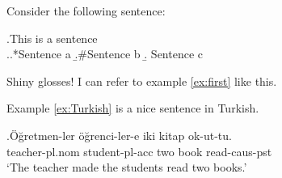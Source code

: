 \documentclass{article}
\title{}
\author{}
\date{}
\begin{document}
Consider the following sentence:

\ex.This is a sentence \label{ex:first}\\

\ex.\a.*Sentence a %
    \b.\#Sentence b
    \b. Sentence c
    
Shiny glosses!  I can refer to example \ref{ex:first} like this. %

Example \ref{ex:Turkish} is a nice sentence in Turkish.

\exg.Öğretmen-ler öğrenci-ler-e iki kitap ok-ut-tu. \label{ex:Turkish}\\
       teacher-{\sc pl.nom} student-{\sc pl-acc} two book read-{\sc caus-pst}\\ %
        `The teacher made the students read two books.'
\end{document}
